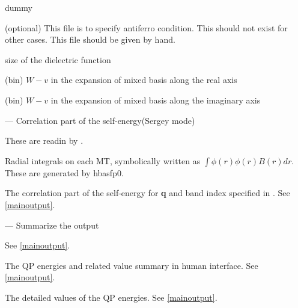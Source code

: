 \infiles


 dummy







(optional) This file is to specify antiferro condition. 
This should not exist for other cases.
This file should be given by hand.

\outfiles

size of the dielectric function

(bin) $W-v$ in the expansion of mixed basis along the real axis

(bin) $W-v$ in the expansion of mixed basis along the imaginary axis



--- Correlation part of the self-energy(Sergey mode)

\infiles

 These are readin by .



 Radial integrals on each MT, symbolically written as 
  $\int \phi(r) \phi(r) B(r) dr$. 
  These are generated by {\sf hbasfp0}.





\outfiles

 The correlation part of the self-energy for {\bf q} and band index specified in . See \ref{mainoutput}.



--- Summarize the output

\infiles

 See \ref{mainoutput}.

\outfiles

  The QP energies and related value summary in human interface. See \ref{mainoutput}.

 The detailed values of the QP energies. See \ref{mainoutput}.

